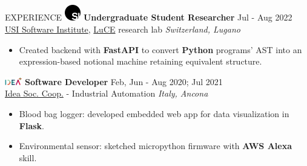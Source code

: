 \documentclass{cv} %
\def\intraexpvspace{0.15cm}
\begin{document}
\begin{minipage}[l]{0.7\linewidth}
\begin{rSection}{EXPERIENCE}
    \includegraphics[width=0.7cm, trim={0cm 10cm 0cm 0cm}]{si-icon.jpg}
    \hspace*{0cm}\textbf{Undergraduate Student Researcher} \hfill Jul - Aug 2022\\
    \hspace*{0.85cm}\href{https://www.si.usi.ch/}{USI Software Institute},
    \href{https://luce.si.usi.ch/team/}{LuCE} research lab
    \hfill \textit{Switzerland, Lugano}
    \begin{itemize}
        \item Created backend with \textbf{FastAPI} to convert \textbf{Python} programs' AST
              into an expression-based notional machine retaining equivalent structure.
    \end{itemize}
    \vspace{\intraexpvspace}
    \vspace{\intraexpvspace}

    \includegraphics[width=0.75cm, trim={0cm 1.5cm 0cm 0cm}]{idea-icon.png}
    \textbf{Software Developer} \hfill Feb, Jun - Aug 2020; Jul 2021\\
    \hspace*{0.85cm}\href{https://idea-on-line.it/}{Idea Soc. Coop.} - Industrial Automation 
    \hfill \textit{Italy, Ancona}
    \begin{itemize}
        \item Blood bag logger: 
            developed embedded web app for data visualization in \textbf{Flask}.

        \item Environmental sensor: 
            sketched micropython firmware with \textbf{AWS Alexa} skill.
    \end{itemize}
    \vspace{\intraexpvspace}
    \vspace{\intraexpvspace}


\end{rSection}
\end{minipage}
\end{document}
